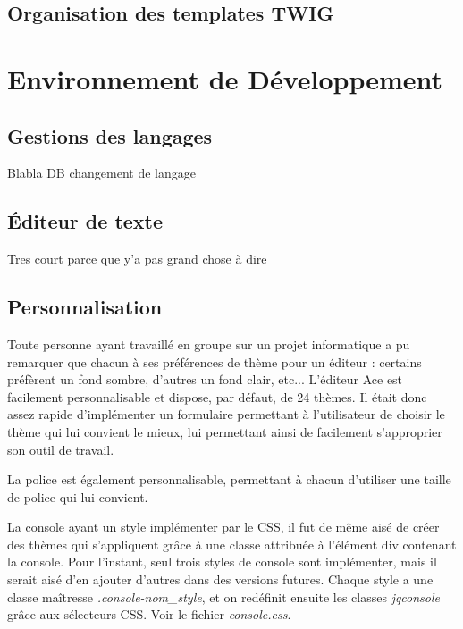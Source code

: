 
\subsection{Organisation des templates TWIG}

\section{Environnement de Développement}

\subsection{Gestions des langages}
Blabla DB changement de langage

\subsection{Éditeur de texte}
Tres court parce que y'a pas grand chose à dire

\subsection{Personnalisation}

Toute personne ayant travaillé en groupe sur un projet informatique a pu remarquer que chacun à ses préférences de thème pour un éditeur : certains préfèrent un fond sombre, d'autres un fond clair, etc...
L'éditeur Ace est facilement personnalisable et dispose, par défaut, de 24 thèmes. Il était donc assez rapide d'implémenter un formulaire permettant à l'utilisateur de choisir le thème qui lui convient le mieux, lui permettant ainsi de facilement s'approprier son outil de travail.

La police est également personnalisable, permettant à chacun d'utiliser une taille de police qui lui convient.

La console ayant un style implémenter par le CSS, il fut de même aisé de créer des thèmes qui s'appliquent grâce à une classe attribuée à l'élément div contenant la console.
Pour l'instant, seul trois styles de console sont implémenter, mais il serait aisé d'en ajouter d'autres dans des versions futures.
Chaque style a une classe maîtresse \emph{.console-nom\_style}, et on redéfinit ensuite les classes \emph{jqconsole} grâce aux sélecteurs CSS. Voir le fichier \emph{console.css}.


